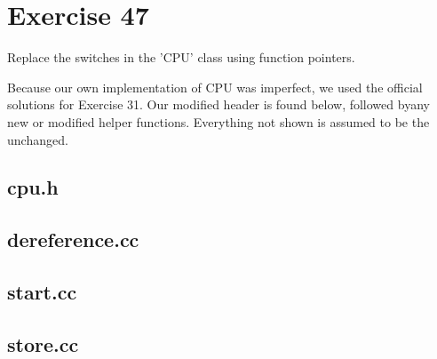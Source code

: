 \section{Exercise 47}
\begin{question}
Replace the switches in the 'CPU' class using function pointers.
\end{question}

\begin{solution}
    Because our own implementation of CPU was imperfect, we used the official solutions for Exercise 31.
    Our modified header is found below, followed byany new or modified helper functions. Everything not shown is assumed to be the unchanged.
    \subsection{cpu.h}
    \subsection{dereference.cc}
    \subsection{start.cc}
    \subsection{store.cc}
\end{solution}
